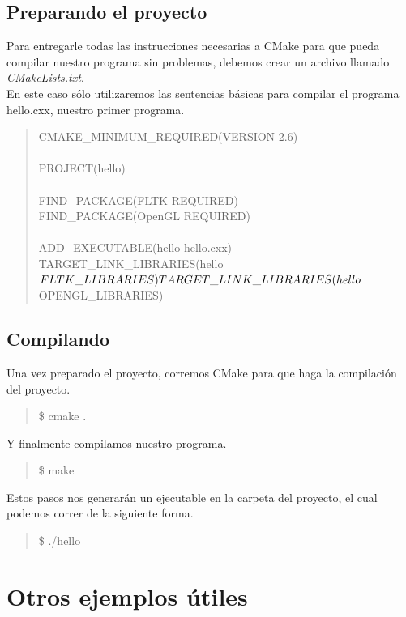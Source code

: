 \documentclass[10pt, oneside]{article}   	%
\begin{document}
\subsection{Preparando el proyecto}
Para entregarle todas las instrucciones necesarias a CMake para que pueda compilar nuestro programa sin problemas, debemos crear un archivo llamado \textit{CMakeLists.txt}.\\
En este caso sólo utilizaremos las sentencias básicas para compilar el programa hello.cxx, nuestro primer programa.
\begin{quote}
CMAKE\_MINIMUM\_REQUIRED(VERSION 2.6)\\
\\
PROJECT(hello)\\
\\
FIND\_PACKAGE(FLTK REQUIRED)\\
FIND\_PACKAGE(OpenGL REQUIRED)\\
\\
ADD\_EXECUTABLE(hello hello.cxx)\\
TARGET\_LINK\_LIBRARIES(hello ${FLTK\_LIBRARIES})\\
TARGET\_LINK\_LIBRARIES(hello ${OPENGL\_LIBRARIES})\\
\end{quote}
\subsection{Compilando}
Una vez preparado el proyecto, corremos CMake para que haga la compilación del proyecto.
\begin{quote}
\$ cmake .
\end{quote}
Y finalmente compilamos nuestro programa.
\begin{quote}
\$ make
\end{quote}
Estos pasos nos generarán un ejecutable en la carpeta del proyecto, el cual podemos correr de la siguiente forma.
\begin{quote}
\$ ./hello
\end{quote}

\section{Otros ejemplos útiles}
\end{document}

